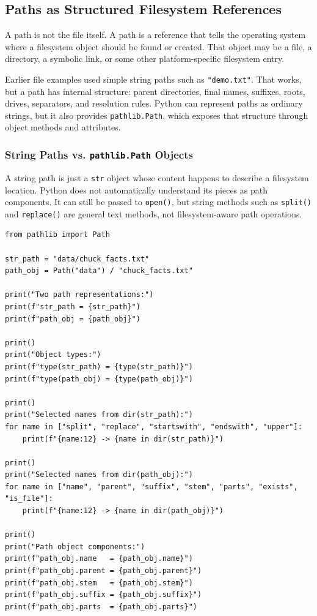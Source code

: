 \subsection{Paths as Structured Filesystem References}

A path is not the file itself. A path is a reference that tells the operating system where a filesystem object should be found or created. That object may be a file, a directory, a symbolic link, or some other platform-specific filesystem entry.

Earlier file examples used simple string paths such as \texttt{"demo.txt"}. That works, but a path has internal structure: parent directories, final names, suffixes, roots, drives, separators, and resolution rules. Python can represent paths as ordinary strings, but it also provides \texttt{pathlib.Path}, which exposes that structure through object methods and attributes.

\subsubsection{String Paths vs. \texttt{pathlib.Path} Objects}

A string path is just a \texttt{str} object whose content happens to describe a filesystem location. Python does not automatically understand its pieces as path components. It can still be passed to \texttt{open()}, but string methods such as \texttt{split()} and \texttt{replace()} are general text methods, not filesystem-aware path operations.

\begin{verbatim}
from pathlib import Path

str_path = "data/chuck_facts.txt"
path_obj = Path("data") / "chuck_facts.txt"

print("Two path representations:")
print(f"str_path = {str_path}")
print(f"path_obj = {path_obj}")

print()
print("Object types:")
print(f"type(str_path) = {type(str_path)}")
print(f"type(path_obj) = {type(path_obj)}")

print()
print("Selected names from dir(str_path):")
for name in ["split", "replace", "startswith", "endswith", "upper"]:
    print(f"{name:12} -> {name in dir(str_path)}")

print()
print("Selected names from dir(path_obj):")
for name in ["name", "parent", "suffix", "stem", "parts", "exists", "is_file"]:
    print(f"{name:12} -> {name in dir(path_obj)}")

print()
print("Path object components:")
print(f"path_obj.name   = {path_obj.name}")
print(f"path_obj.parent = {path_obj.parent}")
print(f"path_obj.stem   = {path_obj.stem}")
print(f"path_obj.suffix = {path_obj.suffix}")
print(f"path_obj.parts  = {path_obj.parts}")
\end{verbatim}


